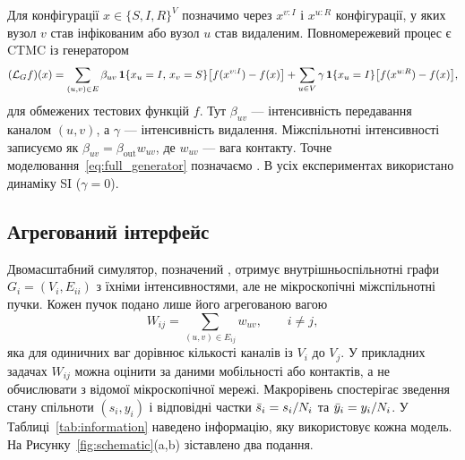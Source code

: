 Для конфігурації $x\in\{S,I,R\}^V$ позначимо через $x^{v:I}$ і $x^{u:R}$ конфігурації, у яких вузол $v$ став інфікованим або вузол $u$ став видаленим. Повномережевий процес є CTMC із генератором
\begin{equation}
\label{eq:full_generator}
(\mathcal{L}_G f)(x)=\sum_{(u,v)\in E}\beta_{uv}\,\mathbf{1}\{x_u=I,\,x_v=S\}\bigl[f(x^{v:I})-f(x)\bigr]
+\sum_{u\in V}\gamma\,\mathbf{1}\{x_u=I\}\bigl[f(x^{u:R})-f(x)\bigr],
\end{equation}
для обмежених тестових функцій $f$. Тут $\beta_{uv}$ --- інтенсивність передавання каналом $(u,v)$, а $\gamma$ --- інтенсивність видалення. Міжспільнотні інтенсивності записуємо як $\beta_{uv}=\beta_{\mathrm{out}}w_{uv}$, де $w_{uv}$ --- вага контакту. Точне моделювання~\eqref{eq:full_generator} позначаємо \Full{}. В усіх експериментах використано динаміку SI ($\gamma=0$).

\subsection{Агрегований інтерфейс}
\label{sec:interface}

Двомасштабний симулятор, позначений \TS{}, отримує внутрішньоспільнотні графи $G_i=(V_i,E_{ii})$ з їхніми інтенсивностями, але не мікроскопічні міжспільнотні пучки. Кожен пучок подано лише його агрегованою вагою
\begin{equation}
\label{eq:weight}
W_{ij}=\sum_{(u,v)\in E_{ij}}w_{uv},\qquad i\neq j,
\end{equation}
яка для одиничних ваг дорівнює кількості каналів із $V_i$ до $V_j$. У прикладних задачах $W_{ij}$ можна оцінити за даними мобільності або контактів, а не обчислювати з відомої мікроскопічної мережі. Макрорівень спостерігає зведення стану спільноти $(s_i,y_i)$ і відповідні частки $\bar{s}_i=s_i/N_i$ та $\bar{y}_i=y_i/N_i$. У Таблиці~\ref{tab:information} наведено інформацію, яку використовує кожна модель. На Рисунку~\ref{fig:schematic}(a,b) зіставлено два подання.

